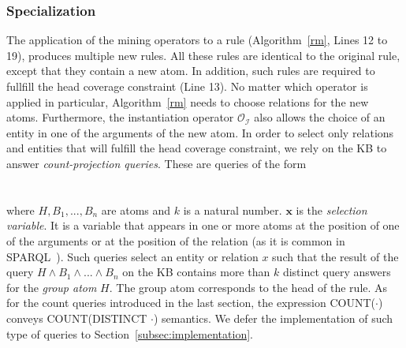 {\subsubsection{Specialization}
\label{subsubsec:specialization}

The application of the mining operators to a rule (Algorithm~\ref{rm}, Lines 12 to 19), produces multiple new rules. 
All these rules are identical to the original rule, except that they contain
a new atom. In addition, such rules are required to fullfill the head coverage constraint (Line 13). No matter which operator is applied in particular, Algorithm~\ref{rm} needs to choose relations
for the new atoms. Furthermore, the instantiation operator $\mathcal{O_I}$ also allows the choice of an entity in one 
of the arguments of the new atom.
In order to select only relations and entities that will fulfill the head coverage constraint, 
we rely on the KB to answer \emph{count-projection queries}.
These are queries of the form \\ \\
 \\

\noindent where $H, B_1, ..., B_n$ are atoms and $k$ is a natural number.
$\bm{x}$ is the \emph{selection variable}.
It is a variable that appears in one or more atoms at the position of one of the arguments or at the position of the relation (as it is common in SPARQL~\cite{sparql}). 
Such queries select an entity or relation $x$ such that the result of the query $H \wedge B_1 \wedge ... \wedge B_n$ on the KB contains more than $k$ distinct query answers
for the \emph{group atom} $H$. The group atom corresponds to the head of the rule. As for the count queries introduced
in the last section, the expression COUNT($\cdot$) conveys COUNT(DISTINCT $\cdot$) semantics.
We defer the implementation of such type of queries to Section~\ref{subsec:implementation}.


}
